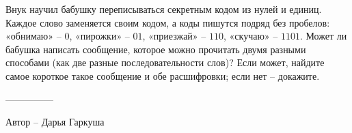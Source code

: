 \question
Внук научил бабушку переписываться секретным кодом из нулей и единиц. Каждое слово заменяется своим кодом, а коды пишутся подряд без пробелов: «обнимаю» -- $0$, «пирожки» -- $01$, «приезжай» -- $110$, «скучаю» -- $1101$. Может ли бабушка написать сообщение, которое можно прочитать двумя разными способами (как две разные последовательности слов)? Если может, найдите самое короткое такое сообщение и обе расшифровки; если нет -- докажите.

---------------

Автор -- Дарья Гаркуша